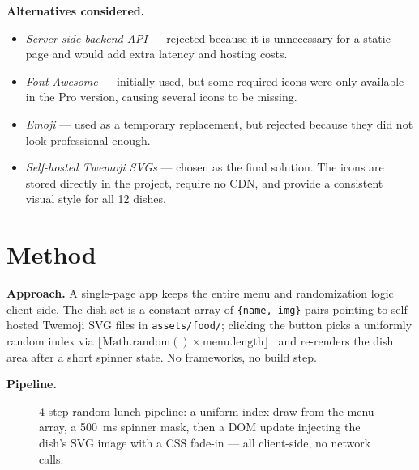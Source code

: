 \documentclass[11pt,a4paper]{article}
\begin{document}
\textbf{Alternatives considered.}
\begin{itemize}[leftmargin=2em,itemsep=1pt]
  \item \emph{Server-side backend API} --- rejected because it is unnecessary for a static page and would add extra latency and hosting costs.
  \item \emph{Font Awesome} --- initially used, but some required icons were only available in the Pro version, causing several icons to be missing.
  \item \emph{Emoji} --- used as a temporary replacement, but rejected because they did not look professional enough.
  \item \emph{Self-hosted Twemoji SVGs} --- chosen as the final solution. The icons are stored directly in the project, require no CDN, and provide a consistent visual style for all 12 dishes.
\end{itemize}

\section{Method}

\textbf{Approach.} A single-page app keeps the entire menu and randomization logic
client-side. The dish set is a constant array of \texttt{\{name, img\}} pairs pointing to
self-hosted Twemoji SVG files in \texttt{assets/food/}; clicking the button picks a
uniformly random index via
$\lfloor \mathrm{Math.random()} \times \text{menu.length} \rfloor$~\cite{mdnrandom} and
re-renders the dish area after a short spinner state. No frameworks, no build step.

\textbf{Pipeline.}
\begin{figure}[ht]
  \centering
  \caption{4-step random lunch pipeline: a uniform index draw from the menu array, a
  500~ms spinner mask, then a DOM update injecting the dish's SVG image with a CSS
  fade-in --- all client-side, no network calls.}
\end{figure}
\end{document}
